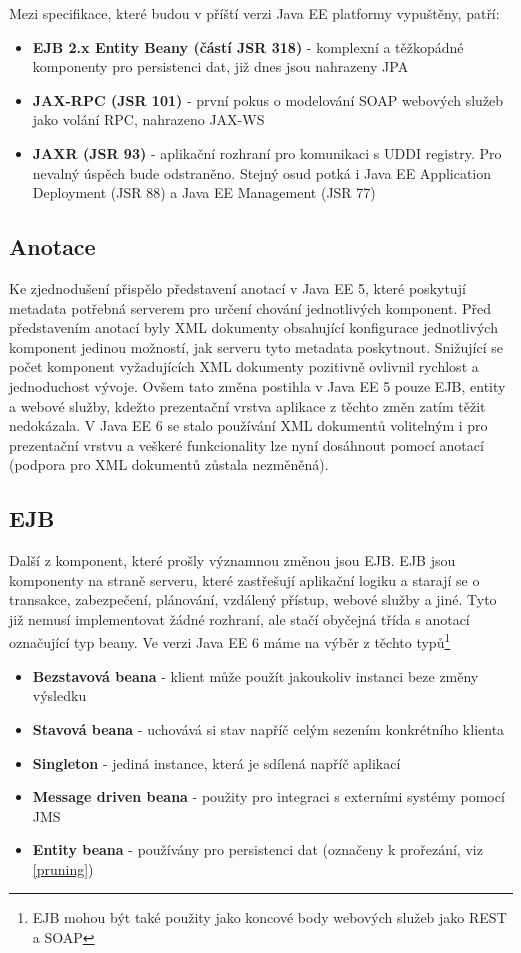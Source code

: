 \documentclass[122pt,oneside]{fithesis}
\begin{document}
Mezi specifikace, které budou v příští verzi Java EE platformy vypuštěny, patří:
\begin{itemize}
  \item {\bf EJB 2.x Entity Beany (částí JSR 318)} - komplexní a těžkopádné komponenty pro persistenci dat, již dnes jsou nahrazeny JPA
  \item {\bf JAX-RPC (JSR 101)} - první pokus o modelování SOAP webových služeb jako volání RPC, nahrazeno JAX-WS
  \item {\bf JAXR (JSR 93)} - aplikační rozhraní pro komunikaci s UDDI registry. Pro nevalný úspěch bude odstraněno. Stejný osud potká i Java EE Application Deployment (JSR 88) a Java EE Management (JSR 77)
\end{itemize}

\subsection{Anotace}
Ke zjednodušení přispělo představení anotací v Java EE 5, které poskytují metadata potřebná serverem pro určení chování jednotlivých komponent. Před představením anotací byly XML dokumenty obsahující konfigurace jednotlivých komponent jedinou možností, jak serveru tyto metadata poskytnout. Snižující se počet komponent vyžadujících XML dokumenty pozitivně ovlivnil rychlost a jednoduchost vývoje. Ovšem tato změna postihla v Java EE 5 pouze EJB, entity a webové služby, kdežto prezentační vrstva aplikace z těchto změn zatím těžit nedokázala. V Java EE 6 se stalo používání XML dokumentů volitelným i pro prezentační vrstvu a veškeré funkcionality lze nyní dosáhnout pomocí anotací (podpora pro XML dokumentů zůstala nezměněná).


\subsection{EJB}
Další z komponent, které prošly významnou změnou jsou EJB. EJB jsou komponenty na straně serveru, které zastřešují aplikační logiku a starají se o transakce, zabezpečení, plánování, vzdálený přístup, webové služby a jiné. Tyto již nemusí implementovat žádné rozhraní, ale stačí obyčejná třída s anotací označující typ beany. Ve verzi Java EE 6 máme na výběr z těchto typů\footnote[1]{EJB mohou být také použity jako koncové body webových služeb jako REST a SOAP}

\begin{itemize}
  \item {\bf Bezstavová beana} - klient může použít jakoukoliv instanci beze změny výsledku
  \item {\bf Stavová beana} - uchovává si stav napříč celým sezením konkrétního klienta
  \item {\bf Singleton} - jediná instance, která je sdílená napříč aplikací
  \item {\bf Message driven beana} - použity pro integraci s externími systémy pomocí JMS
  \item {\bf Entity beana} -  používány pro persistenci dat (označeny k prořezání, viz \ref{pruning})
\end{itemize}
\end{document}
